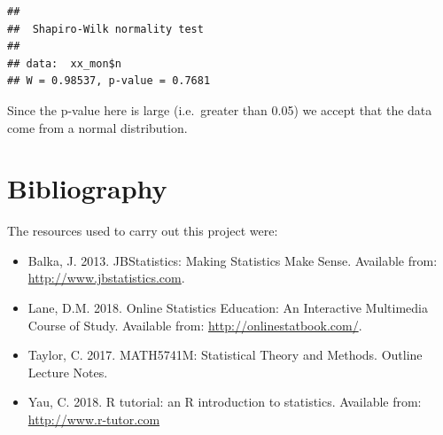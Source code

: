\documentclass[]{article}
\newenvironment{Shaded}{\begin{snugshade}}{\end{snugshade}}
\newcommand{\KeywordTok}[1]{\textcolor[rgb]{0.13,0.29,0.53}{\textbf{{#1}}}}
\newcommand{\NormalTok}[1]{{#1}}
\providecommand{\tightlist}{%
  \setlength{\itemsep}{0pt}\setlength{\parskip}{0pt}}
\begin{document}
\begin{Shaded}
\end{Shaded}

\begin{verbatim}
## 
##  Shapiro-Wilk normality test
## 
## data:  xx_mon$n
## W = 0.98537, p-value = 0.7681
\end{verbatim}

Since the p-value here is large (i.e.~greater than 0.05) we accept that
the data come from a normal distribution.

\section{Bibliography}\label{bibliography}

The resources used to carry out this project were:

\begin{itemize}
\tightlist
\item
  Balka, J. 2013. JBStatistics: Making Statistics Make Sense. Available
  from: \url{http://www.jbstatistics.com}.
\item
  Lane, D.M. 2018. Online Statistics Education: An Interactive
  Multimedia Course of Study. Available from:
  \url{http://onlinestatbook.com/}.
\item
  Taylor, C. 2017. MATH5741M: Statistical Theory and Methods. Outline
  Lecture Notes.
\item
  Yau, C. 2018. R tutorial: an R introduction to statistics. Available
  from: \url{http://www.r-tutor.com}
\end{itemize}
\end{document}
